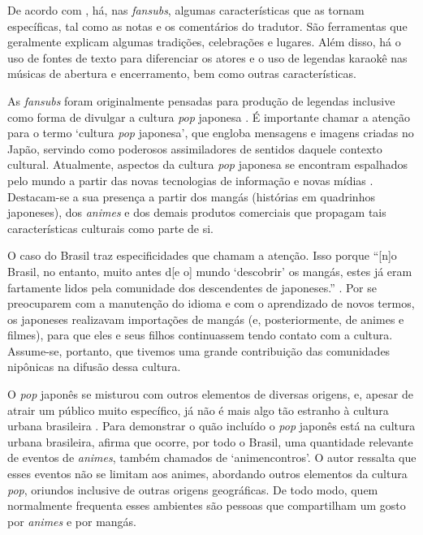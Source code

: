 \documentclass[portuguese]{textolivre}
\begin{document}
De acordo com \textcite{ferrer_simo_fansubs_2005}, há, nas \textit{fansubs}, algumas características que as tornam específicas, tal como as notas e os comentários do tradutor. São ferramentas que geralmente explicam algumas tradições, celebrações e lugares. Além disso, há o uso de fontes de texto para diferenciar os atores e o uso de legendas karaokê nas músicas de abertura e encerramento, bem como outras características. 

As \textit{fansubs} foram originalmente pensadas para produção de legendas inclusive como forma de divulgar a cultura \textit{pop} japonesa \cite{diaz-cintas_fansubs:_2006}. É importante chamar a atenção para o termo ‘cultura \textit{pop} japonesa’, que engloba mensagens e imagens criadas no Japão, servindo como poderosos assimiladores de sentidos daquele contexto cultural. Atualmente, aspectos da cultura \textit{pop} japonesa se encontram espalhados pelo mundo a partir das novas tecnologias de informação e novas mídias . Destacam-se a sua presença a partir dos mangás (histórias em quadrinhos japoneses), dos \textit{animes} e dos demais produtos comerciais que propagam tais características culturais como parte de si.

O caso do Brasil traz especificidades que chamam a atenção. Isso porque “[n]o Brasil, no entanto, muito antes d[e o] mundo ‘descobrir’ os mangás, estes já eram fartamente lidos pela comunidade dos descendentes de japoneses.” \cite[p. 8]{luyten_manga_2014}. Por se preocuparem com a manutenção do idioma e com o aprendizado de novos termos, os japoneses realizavam importações de mangás (e, posteriormente, de animes e filmes), para que eles e seus filhos continuassem tendo contato com a cultura. Assume-se, portanto, que tivemos uma grande contribuição das comunidades nipônicas na difusão dessa cultura. 

O \textit{pop} japonês se misturou com outros elementos de diversas origens, e, apesar de atrair um público muito específico, já não é mais algo tão estranho à cultura urbana brasileira \cite{neto_mangas_2017}. Para demonstrar o quão incluído o \textit{pop} japonês está na cultura urbana brasileira, \textcite{neto_mangas_2017} afirma que ocorre, por todo o Brasil, uma quantidade relevante de eventos de \textit{animes}, também chamados de ‘animencontros’. O autor ressalta que esses eventos não se limitam aos animes, abordando outros elementos da cultura \textit{pop}, oriundos inclusive de outras origens geográficas. De todo modo, quem normalmente frequenta esses ambientes são pessoas que compartilham um gosto por \textit{animes} e por mangás.
\end{document}
